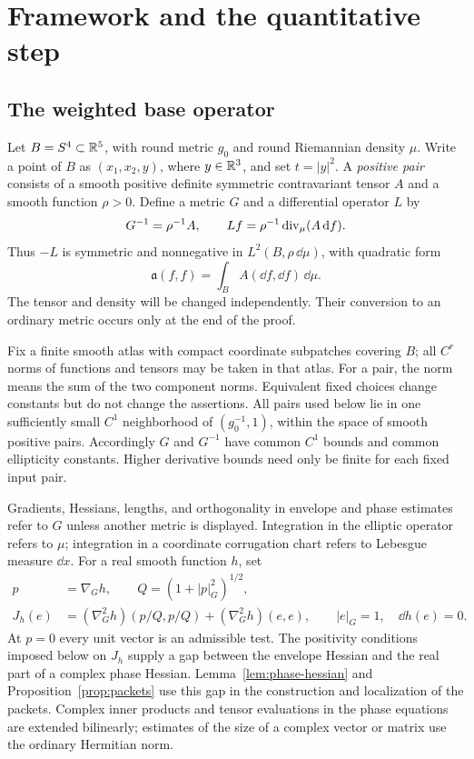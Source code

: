 \section{Framework and the quantitative step}\label{sec:framework}

\subsection{The weighted base operator}

Let $B=S^4\subset\mathbb R^5$, with round metric $g_0$ and round Riemannian
density $\mu$. Write a point of $B$ as $(x_1,x_2,y)$, where $y\in\mathbb R^3$,
and set $t=|y|^2$. A \emph{positive pair} consists of a smooth positive
definite symmetric contravariant tensor $A$ and a smooth function
$\rho>0$. Define a metric $G$ and a differential operator $L$ by
\begin{equation}\label{eq:weighted-operator}
 G^{-1}=\rho^{-1}A,\qquad
 Lf=\rho^{-1}\operatorname{div}_\mu(A\,\mathrm d f).
\end{equation}
Thus $-L$ is symmetric and nonnegative in $L^2(B,\rho\,\dd\mu)$, with
quadratic form
\[
 \mathfrak a(f,f)=\int_B A(\dd f,\dd f)\,\dd\mu .
\]
The tensor and density will be changed independently. Their conversion
to an ordinary metric occurs only at the end of the proof.

Fix a finite smooth atlas with compact coordinate subpatches covering
$B$; all $C^r$ norms of functions and tensors may be taken in that atlas.
For a pair, the norm means the sum of the two component norms.
Equivalent fixed choices change constants but do not change the
assertions. All pairs used below lie in one sufficiently small $C^1$
neighborhood of $(g_0^{-1},1)$, within the space of smooth positive
pairs. Accordingly $G$ and $G^{-1}$ have common $C^1$ bounds and common
ellipticity constants. Higher derivative bounds need only be finite for
each fixed input pair.

Gradients, Hessians, lengths, and orthogonality in envelope and phase
estimates refer to $G$ unless another metric is displayed. Integration
in the elliptic operator refers to $\mu$; integration in a coordinate
corrugation chart refers to Lebesgue measure $\dd x$.
For a real smooth function $h$, set
\begin{equation}\label{eq:hessian-test}
 \begin{split}
 p&=\nabla_G h,\qquad Q=(1+|p|_G^2)^{1/2},\\
 J_h(e)&=(\nabla_G^2h)(p/Q,p/Q)+(\nabla_G^2h)(e,e),
 \qquad |e|_G=1,\quad \dd h(e)=0 .
 \end{split}
\end{equation}
At $p=0$ every unit vector is an admissible test.
The positivity conditions imposed below on $J_h$ supply a gap between
the envelope Hessian and the real part of a complex phase Hessian.
Lemma~\ref{lem:phase-hessian} and Proposition~\ref{prop:packets} use
this gap in the construction and localization of the packets.
Complex inner products
and tensor evaluations in the phase equations are extended
bilinearly; estimates of the size of a complex vector or matrix use
the ordinary Hermitian norm.

